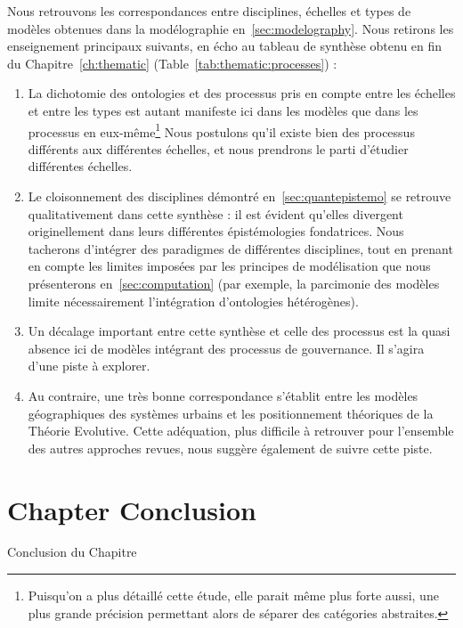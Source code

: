 Nous retrouvons les correspondances entre disciplines, échelles et types de modèles obtenues dans la modélographie en~\ref{sec:modelography}. Nous retirons les enseignement principaux suivants, en écho au tableau de synthèse obtenu en fin du Chapitre~\ref{ch:thematic} (Table~\ref{tab:thematic:processes}) :
\begin{enumerate}
	\item La dichotomie des ontologies et des processus pris en compte entre les échelles et entre les types est autant manifeste ici dans les modèles que dans les processus en eux-même\footnote{Puisqu'on a plus détaillé cette étude, elle parait même plus forte aussi, une plus grande précision permettant alors de séparer des catégories abstraites.} Nous postulons qu'il existe bien des processus différents aux différentes échelles, et nous prendrons le parti d'étudier différentes échelles.
	\item Le cloisonnement des disciplines démontré en~\ref{sec:quantepistemo} se retrouve qualitativement dans cette synthèse : il est évident qu'elles divergent originellement dans leurs différentes épistémologies fondatrices. Nous tacherons d'intégrer des paradigmes de différentes disciplines, tout en prenant en compte les limites imposées par les principes de modélisation que nous présenterons en~\ref{sec:computation} (par exemple, la parcimonie des modèles limite nécessairement l'intégration d'ontologies hétérogènes).
	\item Un décalage important entre cette synthèse et celle des processus est la quasi absence ici de modèles intégrant des processus de gouvernance. Il s'agira d'une piste à explorer.
	\item Au contraire, une très bonne correspondance s'établit entre les modèles géographiques des systèmes urbains et les positionnement théoriques de la Théorie Evolutive. Cette adéquation, plus difficile à retrouver pour l'ensemble des autres approches revues, nous suggère également de suivre cette piste.
\end{enumerate}







\newpage


\section*{Chapter Conclusion}{Conclusion du Chapitre}

